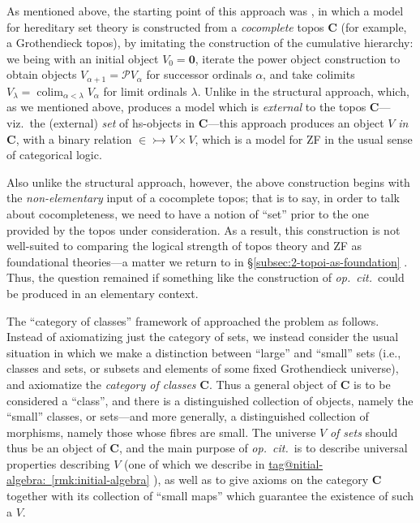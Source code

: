 \documentclass{amsart}
\makeatletter
\newcommand\bC{\mathbf{C}}
\newcommand\colim{\operatorname{co{\lim}}}
\newcommand\opcitspace{\textit{op.~cit.}\ }
\newcommand\pow{\mathcal{P}}
\newcommand\tto{\rightarrowtail}
\newcommand\unin{{\in}}
\newcommand\zset{\mathbf{0}}
\newcommand\tagword[1]{\csname tag@#1\endcsname}
\def\label@tag#1:#2\@nil{#1}
\newcommand\labeltag[1]{\label@tag#1:\@nil}
\newcommand\jref[1]{%
  \texorpdfstring%
    {\hyperref[#1]{\tagword{\labeltag{#1}}~\ref*{#1}}}%
    {\tagword{\labeltag{#1}}~\ref*{#1}}%
}
\newcommand\prerefpost[3]{%
  \texorpdfstring%
    {\hyperref[#2]{#1\ref*{#2}#3}}%
    {#1\ref*{#2}#3}%
}
\newcommand\sref[1]{\prerefpost{\S}{#1}{}}
\theoremstyle{definition}
\theoremstyle{remark}
\theoremstyle{plainwithref}
\makeatother
\begin{document}
As mentioned above, the starting point of this approach was \cite{fourman-sheaf-models,hayashi-set-theories-in-toposes}, in which a model for hereditary set theory is constructed from a \emph{cocomplete} topos \( \bC \) (for example, a Grothendieck topos), by imitating the construction of the cumulative hierarchy: we being with an initial object \( V_0 = \zset \), iterate the power object construction to obtain objects \( V_{\alpha + 1} = \pow V_\alpha \) for successor ordinals \( \alpha \), and take colimits \( V_\lambda = \colim_{\alpha < \lambda} V_\alpha \) for limit ordinals \( \lambda \).
Unlike in the structural approach, which, as we mentioned above, produces a model which is \emph{external} to the topos \( \bC \)---viz.\ the (external) \emph{set} of hs-objects in \( \bC \)---this approach produces an object \( V \) \emph{in} \( \bC \), with a binary relation \( \unin \tto V \times V \), which is a model for ZF in the usual sense of categorical logic.

Also unlike the structural approach, however, the above construction begins with the \emph{non-elementary} input of a cocomplete topos; that is to say, in order to talk about cocompleteness, we need to have a notion of ``set'' prior to the one provided by the topos under consideration.
As a result, this construction is not well-suited to comparing the logical strength of topos theory and ZF as foundational theories---a matter we return to in \sref{subsec:2-topoi-as-foundation}.
Thus, the question remained if something like the construction of \opcitspace could be produced in an elementary context.

The ``category of classes'' framework of \cite{joyal-moerdijk-ast} approached the problem as follows.
Instead of axiomatizing just the category of sets, we instead consider the usual situation in which we make a distinction between ``large'' and ``small'' sets (i.e., classes and sets, or subsets and elements of some fixed Grothendieck universe), and axiomatize the \emph{category of classes} \( \bC \).
Thus a general object of \( \bC \) is to be considered a ``class'', and there is a distinguished collection of objects, namely the ``small'' classes, or sets---and more generally, a distinguished collection of morphisms, namely those whose fibres are small.
The universe \( V \) \emph{of sets} should thus be an object of \( \bC \), and the main purpose of \opcitspace is to describe universal properties describing \( V \) (one of which we describe in \jref{rmk:initial-algebra}), as well as to give axioms on the category \( \bC \) together with its collection of ``small maps'' which guarantee the existence of such a \( V \).
\end{document}
